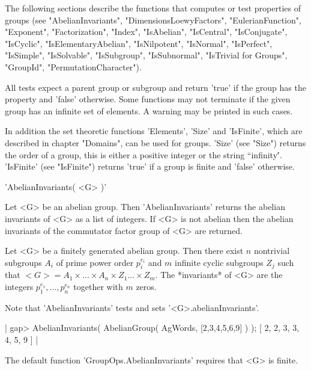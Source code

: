 

The    following sections describe  the functions   that computes or test
properties  of groups (see "AbelianInvariants", "DimensionsLoewyFactors",
"EulerianFunction",   "Exponent",  "Factorization", "Index", "IsAbelian",
"IsCentral",       "IsConjugate",  "IsCyclic",     "IsElementaryAbelian",
"IsNilpotent", "IsNormal",    "IsPerfect",     "IsSimple",  "IsSolvable",
"IsSubgroup",      "IsSubnormal",  "IsTrivial    for Groups",  "GroupId",
"PermutationCharacter").

All tests expect  a  parent group or  subgroup and  return  'true' if the
group has the property  and 'false'  otherwise.   Some functions may  not
terminate if the given group has an infinite set of elements.   A warning
may be printed in such cases.

In   addition  the  set   theoretic  functions  'Elements',   'Size'  and
'IsFinite', which are described in  chapter "Domains",  can be  used  for
groups.  'Size' (see "Size") returns the order of a group, this is either
a  positive  integer  or the  string {``infinity\'\'}.   'IsFinite'  (see
"IsFinite") returns 'true' if a group is finite and 'false' otherwise.


'AbelianInvariants( <G> )'

Let <G>  be  an  abelian  group.   Then  'AbelianInvariants' returns  the
abelian invariants of <G>  as a list of integers.   If <G> is not abelian
then  the abelian invariants  of the  commutator factor  group of <G> are
returned.

Let  <G>  be  a finitely generated abelian  group.  Then there  exist $n$
nontrivial subgroups  $A_i$  of prime  power  order $p_i^{e_i}$  and  $m$
infinite cyclic  subgroups $Z_j$ such that $<G>  = A_1 \times ...  \times
A_n \times  Z_1  ...   \times  Z_m$.   The  *invariants* of  <G> are  the
integers $p_1^{e_1}, ..., p_n^{e_n}$ together with $m$ zeros.

Note that 'AbelianInvariants' tests and sets '<G>.abelianInvariants'.

|    gap> AbelianInvariants( AbelianGroup( AgWords, [2,3,4,5,6,9] ) );
    [ 2, 2, 3, 3, 4, 5, 9 ] |

The  default  function 'GroupOps.AbelianInvariants' requires that  <G> is
finite.

